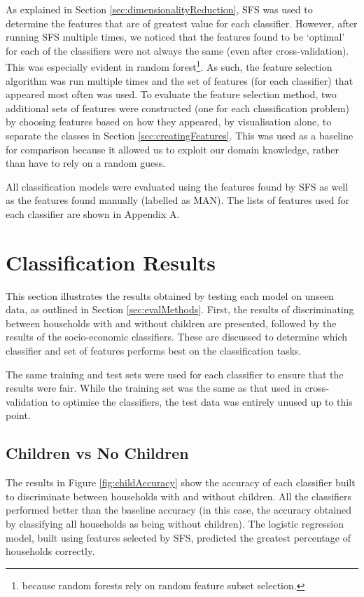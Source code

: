 As explained in Section \ref{sec:dimensionalityReduction}, SFS was used to determine the features that are of greatest value for each classifier. However, after running SFS multiple times, we noticed that the features found to be `optimal' for each of the classifiers were not always the same (even after cross-validation). This was especially evident in random forest\footnote{because random forests rely on random feature subset selection.}.  As such, the feature selection algorithm was run multiple times and the set of features (for each classifier) that appeared most often was used. To evaluate the feature selection method, two additional sets of features were constructed (one for each classification problem) by choosing features based on how they appeared, by visualisation alone, to separate the classes in Section \ref{sec:creatingFeatures}. This was used as a baseline for comparison because it allowed us to exploit our domain knowledge, rather than have to rely on a random guess.  

All classification models were evaluated using the features found by SFS as well as the features found manually (labelled as MAN). The lists of features used for each classifier are shown in Appendix A. 


\section{Classification Results}

This section illustrates the results obtained by testing each model on unseen data, as outlined in Section \ref{sec:evalMethods}. First, the results of discriminating between households with and without children are presented, followed by the results of the socio-economic classifiers. These are discussed to determine which classifier and set of features performs best on the classification tasks.

The same training and test sets were used for each classifier to ensure that the results were fair. While the training set was the same as that used in cross-validation to optimise the classifiers, the test data was entirely unused up to this point.

\subsection{Children vs No Children}

\childConf
\childAccuracy

The results in Figure \ref{fig:childAccuracy} show the accuracy of each classifier built to discriminate between households with and without children. All the classifiers performed better than the baseline accuracy (in this case, the accuracy obtained by classifying all households as being without children). The logistic regression model, built using features selected by SFS, predicted the greatest percentage of households correctly. 

